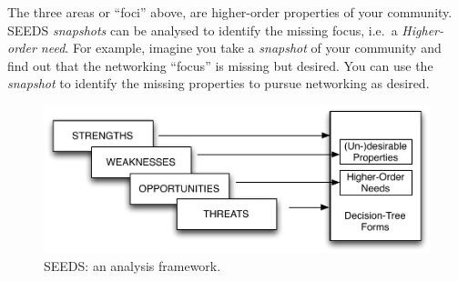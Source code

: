 The three areas or ``foci'' above, are higher-order properties of your community. SEEDS \emph{\emph{snapshots}} can be analysed to identify the missing focus, i.e.~a \emph{Higher-order need}. For example, imagine you take a \emph{snapshot} of your community and find out that the networking ``focus'' is missing but desired. You can use the \emph{snapshot} to identify the missing properties to pursue networking as desired.

\begin{figure}[h!]
    \includegraphics[width=5.4in]{fw.pdf}    %
\caption{\footnotesize SEEDS: an analysis framework.}\label{fwpic}
\end{figure}



%
